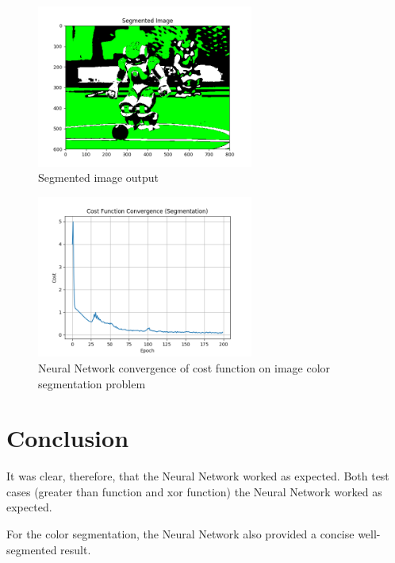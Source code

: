 \documentclass[journal]{IEEEtran}
\begin{document}
\begin{figure}
  \begin{center}
  \includegraphics[width=2.8in]{./../code/result/segmented_image.png}
  \caption{Segmented image output}
  \label{img:result_segmented_img}
  \end{center}
\end{figure}

\begin{figure}
  \begin{center}
  \includegraphics[width=2.8in]{./../code/result/cost_function_convergence_segmentation.png}
  \caption{Neural Network convergence of cost function on image color segmentation problem}
  \label{img:result_convergence}
  \end{center}
\end{figure}

\section {Conclusion}

It was clear, therefore, that the Neural Network worked as expected. Both test cases (greater than function and xor function) the Neural Network worked as expected.

For the color segmentation, the Neural Network also provided a concise well-segmented result.

\vfill
\end{document}
